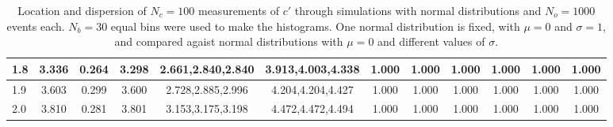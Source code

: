 \begin{table*}[h!]
\begin{center}
\begin{tabular}{| l | c | c | c | c | c | c | c | c | c | c | c |}
1.8 & 3.336 & 0.264 & 3.298 & 2.661,2.840,2.840 & 3.913,4.003,4.338  & 1.000  & 1.000  & 1.000  & 1.000  & 1.000  & 1.000 \\\hline
1.9 & 3.603 & 0.299 & 3.600 & 2.728,2.885,2.996 & 4.204,4.204,4.427  & 1.000  & 1.000  & 1.000  & 1.000  & 1.000  & 1.000 \\\hline
2.0 & 3.810 & 0.281 & 3.801 & 3.153,3.175,3.198 & 4.472,4.472,4.494  & 1.000  & 1.000  & 1.000  & 1.000  & 1.000  & 1.000 \\\hline
\end{tabular}
\caption{Location and dispersion of $N_c=100$
measurements of $c'$ through simulations
with normal distributions and $N_o=1000$ events each.
$N_b=30$ equal bins were used to make the histograms.
One normal distribution is fixed, with $\mu=0$ and $\sigma=1$,
and compared agaist normal distributions with $\mu=0$
and different values of $\sigma$.}
\end{center}
\end{table*}